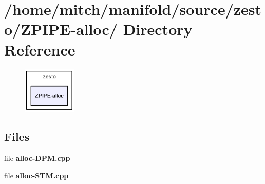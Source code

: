 \section{/home/mitch/manifold/source/zesto/ZPIPE-alloc/ Directory Reference}
\label{dir_c3704c9a0e8c8f206e3597b30463bd0a}


\nopagebreak
\begin{figure}[H]
\begin{center}
\leavevmode
\includegraphics[width=72pt]{dir_c3704c9a0e8c8f206e3597b30463bd0a_dep}
\end{center}
\end{figure}
\subsection*{Files}
\begin{CompactItemize}
\item 
file {\bf alloc-DPM.cpp}
\item 
file {\bf alloc-STM.cpp}
\end{CompactItemize}
